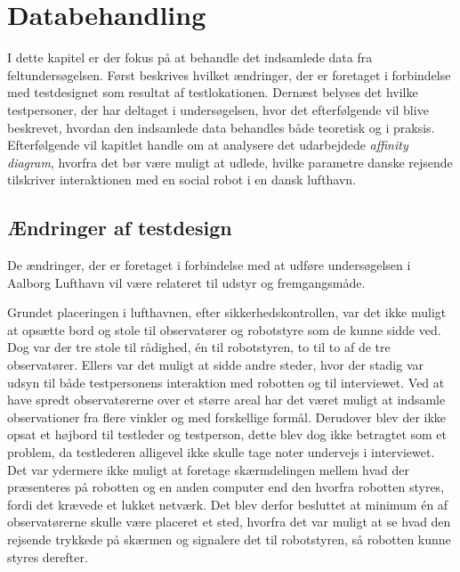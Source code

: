 \chapter{Databehandling}
\label{ParametreDatabehandling}
%
I dette kapitel er der fokus på at behandle det indsamlede data fra feltundersøgelsen. Først beskrives hvilket ændringer, der er foretaget i forbindelse med testdesignet som resultat af testlokationen. Dernæst belyses det hvilke testpersoner, der har deltaget i undersøgelsen, hvor det efterfølgende vil blive beskrevet, hvordan den indsamlede data behandles både teoretisk og i praksis. Efterfølgende vil kapitlet handle om at analysere det udarbejdede \textit{affinity diagram}, hvorfra det bør være muligt at udlede, hvilke parametre danske rejsende tilskriver interaktionen med en social robot i en dansk lufthavn. 

\section{Ændringer af testdesign}
\label{ParametreTestdesign}
%
De ændringer, der er foretaget i forbindelse med at udføre undersøgelsen i Aalborg Lufthavn vil være relateret til udstyr og fremgangsmåde. 

Grundet placeringen i lufthavnen, efter sikkerhedskontrollen, var det ikke muligt at opsætte bord og stole til observatører og robotstyre som de kunne sidde ved. Dog var der tre stole til rådighed, én til robotstyren, to til to af de tre observatører. Ellers var det muligt at sidde andre steder, hvor der stadig var udsyn til både testpersonens interaktion med robotten og til interviewet. Ved at have spredt observatørerne over et større areal har det været muligt at indsamle observationer fra flere vinkler og med forskellige formål. Derudover blev der ikke opsat et højbord til testleder og testperson, dette blev dog ikke betragtet som et problem, da testlederen alligevel ikke skulle tage noter undervejs i interviewet. Det var ydermere ikke muligt at foretage skærmdelingen mellem hvad der præsenteres på robotten og en anden computer end den hvorfra robotten styres, fordi det krævede et lukket netværk. Det blev derfor besluttet at minimum én af observatørerne skulle være placeret et sted, hvorfra det var muligt at se hvad den rejsende trykkede på skærmen og signalere det til robotstyren, så robotten kunne styres derefter.

